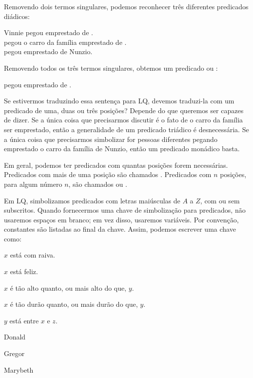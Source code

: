 Removendo dois termos singulares, podemos reconhecer três diferentes predicados diádicos:
\begin{center}
Vinnie pegou \blank emprestado de \blank.\\
\blank pegou o carro da família emprestado de \blank.\\
\blank pegou \blank emprestado de Nunzio.
\end{center}

Removendo todos os três termos singulares, obtemos um predicado  ou :
\begin{center}
\blank pegou \blank emprestado de \blank.
\end{center}

Se estivermos traduzindo essa sentença para LQ, devemos traduzi-la com um predicado de uma, duas ou três posições? Depende do que queremos ser capazes de dizer. Se a única coisa que precisarmos discutir é o fato de o carro da família ser emprestado, então a generalidade de um predicado triádico é desnecessária. Se a única coisa que precisarmos simbolizar for pessoas diferentes pegando emprestado o carro da família de Nunzio, então um predicado monádico basta.

Em geral, podemos ter predicados com quantas posições forem necessárias. Predicados com mais de uma posição são chamados . Predicados com $n$ posições, para algum número $n$, são chamados  ou .

Em LQ, simbolizamos predicados com letras maiúsculas de $A$ a $Z$, com ou sem subscritos. Quando fornecermos uma chave de simbolização para predicados, não usaremos espaços em branco; em vez disso, usaremos variáveis. Por convenção, constantes são listadas ao final da chave. Assim, podemos escrever uma chave como:
\begin{ekey}
\item[Ax:] $x$ está com raiva.
\item[Hx:] $x$ está feliz.
\item[T$_1$xy:] $x$ é tão alto quanto, ou mais alto do que, $y$.
\item[T$_2$xy:] $x$ é tão durão quanto, ou mais durão do que, $y$.
\item[Bxyz:] $y$ está entre $x$ e $z$.
\item[d:] Donald
\item[g:] Gregor
\item[m:] Marybeth
\end{ekey}

